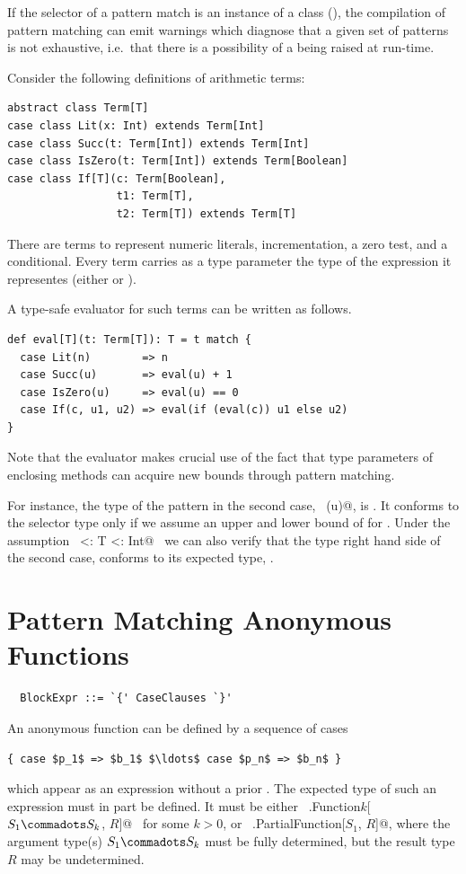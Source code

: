 If the selector of a pattern match is an instance of a
\lstinline@sealed@ class (), 
the compilation of pattern matching can emit warnings which diagnose
that a given set of patterns is not exhaustive, i.e.\ that there is a
possibility of a  being raised at run-time. 

\example\label{ex:eval}
 Consider the following definitions of arithmetic terms:

\begin{lstlisting}
abstract class Term[T]
case class Lit(x: Int) extends Term[Int]
case class Succ(t: Term[Int]) extends Term[Int]
case class IsZero(t: Term[Int]) extends Term[Boolean]
case class If[T](c: Term[Boolean],
                 t1: Term[T],
                 t2: Term[T]) extends Term[T]
\end{lstlisting}
There are terms to represent numeric literals, incrementation, a zero
test, and a conditional. Every term carries as a type parameter the
type of the expression it representes (either  or ).

A type-safe evaluator for such terms can be written as follows.
\begin{lstlisting}
def eval[T](t: Term[T]): T = t match {
  case Lit(n)        => n
  case Succ(u)       => eval(u) + 1
  case IsZero(u)     => eval(u) == 0
  case If(c, u1, u2) => eval(if (eval(c)) u1 else u2)
}
\end{lstlisting}
Note that the evaluator makes crucial use of the fact that type
parameters of enclosing methods can acquire new bounds through pattern
matching.

For instance, the type of the pattern in the second case,
~\lstinline@Succ(u)@, is . It conforms to the selector type
 only if we assume an upper and lower bound of  for .
Under the assumption ~\lstinline@Int <: T <: Int@~ we can also
verify that the type right hand side of the second case, 
conforms to its expected type, .

\section{Pattern Matching Anonymous Functions}
\label{sec:pattern-closures}

\syntax\begin{lstlisting}
  BlockExpr ::= `{' CaseClauses `}'
\end{lstlisting}

An anonymous function can be defined by a sequence of cases 
\begin{lstlisting}
{ case $p_1$ => $b_1$ $\ldots$ case $p_n$ => $b_n$ }
\end{lstlisting}
which appear as an expression without a prior .  The
expected type of such an expression must in part be defined. It must
be either ~\lstinline@scala.Function$k$[$S_1 \commadots S_k$, $R$]@~ for some $k > 0$,
or ~\lstinline@scala.PartialFunction[$S_1$, $R$]@, where the
argument type(s) $S_1 \commadots S_k$ must be fully determined, but the result type
$R$ may be undetermined.

